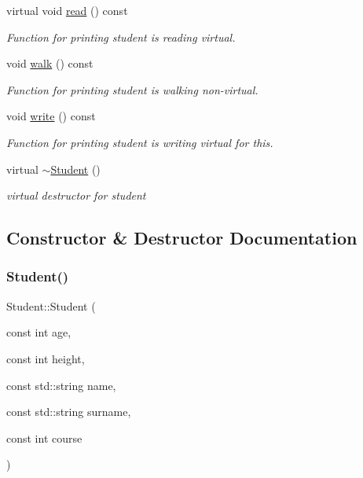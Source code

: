 \begin{DoxyCompactItemize}
\mbox{\label{classStudent_a9d8a4c4d7c9f1d9adcf1565b11eacf60}} 
virtual void \hyperlink{classStudent_a9d8a4c4d7c9f1d9adcf1565b11eacf60}{read} () const
\begin{DoxyCompactList}\small\item\em Function for printing student is reading virtual. \end{DoxyCompactList}\item 
\mbox{\label{classStudent_a889098d7e86767c878db7ad6170ff011}} 
void \hyperlink{classStudent_a889098d7e86767c878db7ad6170ff011}{walk} () const
\begin{DoxyCompactList}\small\item\em Function for printing student is walking non-\/virtual. \end{DoxyCompactList}\item 
\mbox{\label{classStudent_a22acfcea773405fa81a2839640ac0a1d}} 
void \hyperlink{classStudent_a22acfcea773405fa81a2839640ac0a1d}{write} () const
\begin{DoxyCompactList}\small\item\em Function for printing student is writing virtual for this. \end{DoxyCompactList}\item 
\mbox{\label{classStudent_a54a8ea060d6cd04222c3a2f89829f105}} 
virtual \hyperlink{classStudent_a54a8ea060d6cd04222c3a2f89829f105}{$\sim$\+Student} ()
\begin{DoxyCompactList}\small\item\em virtual destructor for student \end{DoxyCompactList}\end{DoxyCompactItemize}


\subsection{Constructor \& Destructor Documentation}
\mbox{\label{classStudent_a0b9f4c8399cf35540091f2499023ff2c}} 
\subsubsection{\texorpdfstring{Student()}{Student()}\hspace{0.1cm}{\footnotesize\ttfamily [1/2]}}
{\footnotesize\ttfamily Student\+::\+Student (\begin{DoxyParamCaption}\item[{const int}]{age,  }\item[{const int}]{height,  }\item[{const std\+::string}]{name,  }\item[{const std\+::string}]{surname,  }\item[{const int}]{course }\end{DoxyParamCaption})}



